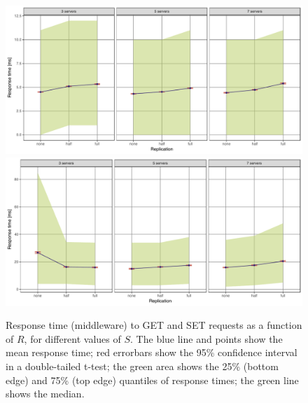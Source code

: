 \documentclass[11pt]{article}
\begin{document}
\begin{figure}[h]
\centering
\includegraphics[width=\textwidth]{../results/replication/graphs/response_time_vs_replication_get.pdf}
\includegraphics[width=\textwidth]{../results/replication/graphs/response_time_vs_replication_set.pdf}
\caption{Response time (middleware) to GET and SET requests as a function of $R$, for different values of $S$. The blue line and points show the mean response time; red errorbars show the 95\% confidence interval in a double-tailed t-test; the green area shows the 25\% (bottom edge) and 75\% (top edge) quantiles of response times; the green line shows the median.}
\label{fig:exp2:res:replication}
\end{figure}
\end{document}

